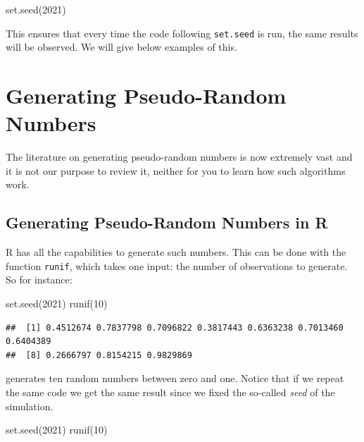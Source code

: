 \documentclass[
]{book}
\newenvironment{Shaded}{\begin{snugshade}}{\end{snugshade}}
\newcommand{\DecValTok}[1]{\textcolor[rgb]{0.00,0.00,0.81}{#1}}
\newcommand{\FunctionTok}[1]{\textcolor[rgb]{0.00,0.00,0.00}{#1}}
\newcommand{\NormalTok}[1]{#1}
\theoremstyle{definition}
\theoremstyle{definition}
\theoremstyle{definition}
\theoremstyle{definition}
\theoremstyle{remark}
\begin{document}
\begin{Shaded}
\begin{Highlighting}[]
\FunctionTok{set.seed}\NormalTok{(}\DecValTok{2021}\NormalTok{)}
\end{Highlighting}
\end{Shaded}

This ensures that every time the code following \texttt{set.seed} is run, the same results will be observed. We will give below examples of this.

\hypertarget{generating-pseudo-random-numbers}{%
\section{Generating Pseudo-Random Numbers}\label{generating-pseudo-random-numbers}}

The literature on generating pseudo-random numbers is now extremely vast and it is not our purpose to review it, neither for you to learn how such algorithms work.

\hypertarget{generating-pseudo-random-numbers-in-r}{%
\subsection{Generating Pseudo-Random Numbers in R}\label{generating-pseudo-random-numbers-in-r}}

R has all the capabilities to generate such numbers. This can be done with the function \texttt{runif}, which takes one input: the number of observations to generate. So for instance:

\begin{Shaded}
\begin{Highlighting}[]
\FunctionTok{set.seed}\NormalTok{(}\DecValTok{2021}\NormalTok{)}
\FunctionTok{runif}\NormalTok{(}\DecValTok{10}\NormalTok{)}
\end{Highlighting}
\end{Shaded}

\begin{verbatim}
##  [1] 0.4512674 0.7837798 0.7096822 0.3817443 0.6363238 0.7013460 0.6404389
##  [8] 0.2666797 0.8154215 0.9829869
\end{verbatim}

generates ten random numbers between zero and one. Notice that if we repeat the same code we get the same result since we fixed the so-called \emph{seed} of the simulation.

\begin{Shaded}
\begin{Highlighting}[]
\FunctionTok{set.seed}\NormalTok{(}\DecValTok{2021}\NormalTok{)}
\FunctionTok{runif}\NormalTok{(}\DecValTok{10}\NormalTok{)}
\end{Highlighting}
\end{Shaded}
\end{document}
